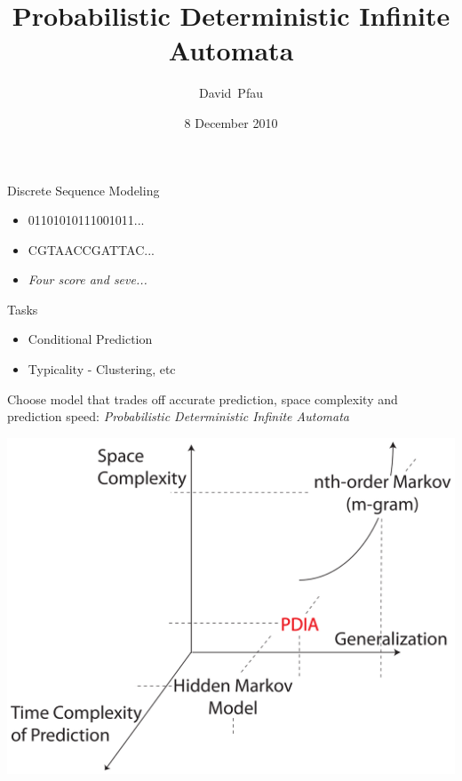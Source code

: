 \documentclass[16pt]{beamer}
\title[Probabilistic Deterministic Infinite Automata] 
{
	Probabilistic Deterministic Infinite Automata
}
\author[D. Pfau, N. Bartlett, F. Wood]
{
  David~Pfau %
}
\institute[Columbia]
{
  Columbia University
}
\date[Poster T81]
{8 December 2010}
\begin{document}
\begin{frame}
	\begin{block}{Discrete Sequence Modeling}
		\begin{itemize}
			\item{01101010111001011...}
			\item{CGTAACCGATTAC...}
			\item{\em Four score and seve...}
		\end{itemize}
	\end{block}
	\begin{block}{Tasks}
		\begin{itemize}
			\item{Conditional Prediction}
			\item{Typicality - Clustering, etc}
		\end{itemize}
	\end{block}
\end{frame}

\begin{frame}
	Choose model that trades off accurate prediction, space complexity and prediction speed: {\em Probabilistic Deterministic Infinite Automata} 
	\begin{center}
		\includegraphics[scale=0.1]{plot.pdf}
	\end{center}
\end{frame}
\end{document}
